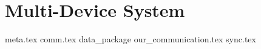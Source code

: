 \chapter{Multi-Device System}
{meta.tex}
{comm.tex}
{data_package}
{our_communication.tex}
{sync.tex}
